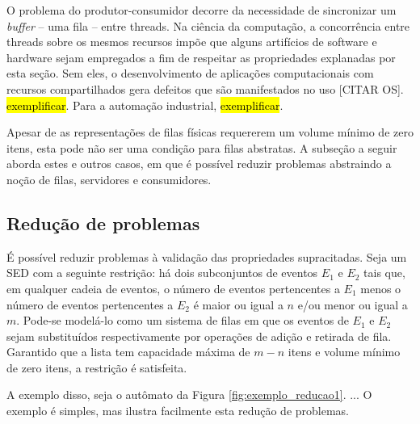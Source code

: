 O problema do produtor-consumidor decorre da necessidade de sincronizar um \textit{buffer} -- uma fila -- entre threads. Na ciência da computação, a concorrência entre threads sobre os mesmos recursos impõe que alguns artifícios de software e hardware sejam empregados a fim de respeitar as propriedades explanadas por esta seção. Sem eles, o desenvolvimento de aplicações computacionais com recursos compartilhados gera defeitos que são manifestados no uso [CITAR OS]. \hl{exemplificar}. Para a automação industrial, \hl{exemplificar}.

Apesar de as representações de filas físicas requererem um volume mínimo de zero itens, esta pode não ser uma condição para filas abstratas. A subseção a seguir aborda estes e outros casos, em que é possível reduzir problemas abstraindo a noção de filas, servidores e consumidores.

\subsection{Redução de problemas}

É possível reduzir problemas à validação das propriedades supracitadas. Seja um SED com a seguinte restrição: há dois subconjuntos de eventos $E_1$ e $E_2$ tais que, em qualquer cadeia de eventos, o número de eventos pertencentes a $E_1$ menos o número de eventos pertencentes a $E_2$ é maior ou igual a $n$ e/ou menor ou igual a $m$. Pode-se modelá-lo como um sistema de filas em que os eventos de $E_1$ e $E_2$ sejam substituídos respectivamente por operações de adição e retirada de fila. Garantido que a lista tem capacidade máxima de $m - n$ itens e volume mínimo de zero itens, a restrição é satisfeita.

A exemplo disso, seja o autômato da Figura \ref{fig:exemplo_reducao1}. ... O exemplo é simples, mas ilustra facilmente esta redução de problemas.


